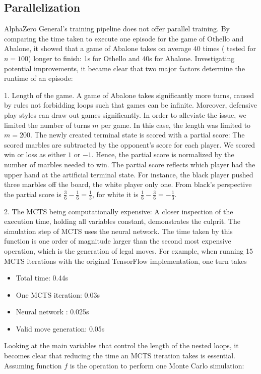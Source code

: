 \subsection{Parallelization}
\label{parallelization}
AlphaZero General's training pipeline does not offer parallel training. By comparing the time taken to execute one episode for the game of Othello and Abalone, it showed that a game of Abalone takes on average $40$ times ( tested for $n=100$) longer to finish: 1s for Othello and 40s for Abalone. Investigating potential improvements, it became clear that two major factors determine the runtime of an episode:

1. Length of the game. A game of Abalone takes significantly more turns, caused by rules not forbidding loops such that games can be infinite. Moreover, defensive play styles can draw out games significantly. In order to alleviate the issue, we limited the number of turns $m$ per game. In this case, the length was limited to $m=200$. The newly created terminal state is scored with a partial score: The scored marbles are subtracted by the opponent's score for each player. We scored win or loss as either $1$ or $-1$. Hence, the partial score is normalized by the number of marbles needed to win. The partial score reflects which player had the upper hand at the artificial terminal state. For instance, the black player pushed three marbles off the board, the white player only one. From black's perspective the partial score is $\frac{3}{6} - \frac{1}{6} = \frac{1}{3}$, for white it is $\frac{1}{6} - \frac{3}{6} = -\frac{1}{3}$.

2. The MCTS being computationally expensive: A closer inspection of the execution time, holding all variables constant, demonstrates the culprit. The simulation step of MCTS uses the neural network. The time taken by this function is one order of magnitude larger than the second most expensive operation, which is the generation of legal moves. For example, when running 15 MCTS iterations with the original TensorFlow implementation, one turn takes

\begin{itemize}
    \item Total time: 0.44s
    \item One MCTS iteration: 0.03s
    \item Neural network : 0.025s
    \item Valid move generation: 0.05s
\end{itemize}

Looking at the main variables that control the length of the nested loops, it becomes clear that reducing the time an MCTS iteration takes is essential. Assuming function $f$ is the operation to perform one Monte Carlo simulation:

